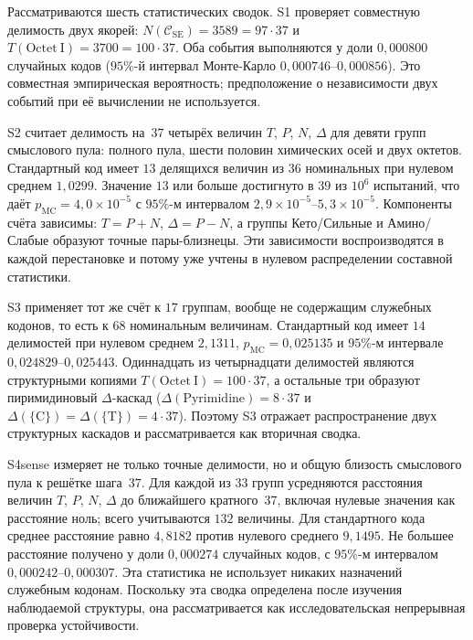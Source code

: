 \documentclass[11pt,a4paper]{article}
\renewcommand{\_}{\origunderscore\allowbreak}
\begin{document}
Рассматриваются шесть статистических сводок. S1 проверяет
совместную делимость двух якорей:
$N(\mathcal{C}_{\mathrm{SE}}) = 3589 = 97 \cdot 37$ и
$T(\mathrm{Octet~I}) = 3700 = 100 \cdot 37$. Оба события
выполняются у доли $0{,}000800$ случайных кодов ($95\%$-й
интервал Монте-Карло $0{,}000746$--$0{,}000856$). Это совместная
эмпирическая вероятность; предположение о независимости двух
событий при её вычислении не используется.

S2 считает делимость на~$37$ четырёх величин $T$, $P$, $N$,
$\Delta$ для девяти групп смыслового пула: полного пула, шести
половин химических осей и двух октетов. Стандартный код имеет
$13$ делящихся величин из $36$ номинальных при нулевом среднем
$1{,}0299$. Значение $13$ или больше достигнуто в $39$ из
$10^{6}$ испытаний, что даёт
$p_{\mathrm{MC}} = 4{,}0 \times 10^{-5}$ с $95\%$-м интервалом
$2{,}9 \times 10^{-5}$--$5{,}3 \times 10^{-5}$. Компоненты
счёта зависимы: $T=P+N$, $\Delta=P-N$, а группы Кето/Сильные и
Амино/Слабые образуют точные пары-близнецы. Эти зависимости
воспроизводятся в каждой перестановке и потому уже учтены в
нулевом распределении составной статистики.

S3 применяет тот же счёт к $17$ группам, вообще не содержащим
служебных кодонов, то есть к $68$ номинальным величинам.
Стандартный код имеет $14$ делимостей при нулевом среднем
$2{,}1311$, $p_{\mathrm{MC}} = 0{,}025135$ и $95\%$-м интервале
$0{,}024829$--$0{,}025443$. Одиннадцать из четырнадцати
делимостей являются структурными копиями
$T(\mathrm{Octet~I}) = 100 \cdot 37$, а остальные три образуют
пиримидиновый $\Delta$-каскад
($\Delta(\mathrm{Pyrimidine}) = 8 \cdot 37$ и
$\Delta(\{\mathrm{C}\}) = \Delta(\{\mathrm{T}\}) = 4 \cdot 37$).
Поэтому S3 отражает распространение двух структурных каскадов и
рассматривается как вторичная сводка.

S4sense измеряет не только точные делимости, но и общую близость
смыслового пула к решётке шага~$37$. Для каждой из $33$ групп
усредняются расстояния величин $T$, $P$, $N$, $\Delta$ до
ближайшего кратного~$37$, включая нулевые значения как расстояние
ноль; всего учитываются $132$ величины. Для стандартного кода
среднее расстояние равно $4{,}8182$ против нулевого среднего
$9{,}1495$. Не большее расстояние получено у доли $0{,}000274$
случайных кодов, с $95\%$-м интервалом
$0{,}000242$--$0{,}000307$. Эта статистика не использует никаких
назначений служебным кодонам. Поскольку эта сводка определена
после изучения наблюдаемой структуры, она рассматривается как
исследовательская непрерывная проверка устойчивости.
\end{document}

